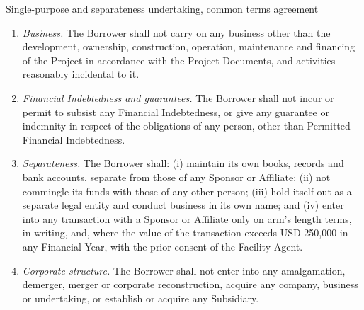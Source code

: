 \begin{clause}{Single-purpose and separateness undertaking, common terms agreement \illustrative}\label{cl:2.1}
\begin{enumerate}[label=(\alph*)]
\item \emph{Business.} The Borrower shall not carry on any business other than the development, ownership, construction, operation, maintenance and financing of the Project in accordance with the Project Documents, and activities reasonably incidental to it.
\item \emph{Financial Indebtedness and guarantees.} The Borrower shall not incur or permit to subsist any Financial Indebtedness, or give any guarantee or indemnity in respect of the obligations of any person, other than Permitted Financial Indebtedness.
\item \emph{Separateness.} The Borrower shall: (i) maintain its own books, records and bank accounts, separate from those of any Sponsor or Affiliate; (ii) not commingle its funds with those of any other person; (iii) hold itself out as a separate legal entity and conduct business in its own name; and (iv) enter into any transaction with a Sponsor or Affiliate only on arm's length terms, in writing, and, where the value of the transaction exceeds USD 250,000 in any Financial Year, with the prior consent of the Facility Agent.
\item \emph{Corporate structure.} The Borrower shall not enter into any amalgamation, demerger, merger or corporate reconstruction, acquire any company, business or undertaking, or establish or acquire any Subsidiary.
\end{enumerate}
\end{clause}

